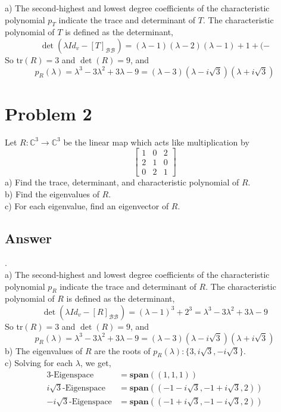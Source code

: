 \documentclass[
	12pt, %
]{fphw}
\newcommand\br{\vspace{10 pt}}
\newcommand\0{\mathbf{0}}
\newcommand\set[1]{\{#1\}}
\newcommand\C[1]{\text{$\mathbb{C}^{#1}$}}
\newcommand\B[1]{\text{$\mathcal{B}_{#1}$}}
\newcommand\spann[1]{\mathbf{span}(#1)}
\begin{document}
\br
\noindent
a) The second-highest and lowest degree coefficients of the characteristic polynomial $p_T$ indicate the trace and determinant of $T$. The characteristic polynomial of $T$ is defined as the determinant,
\begin{equation*}
\det(\lambda Id_v - [T]_{\B{}\B{}}) = (\lambda - 1)(\lambda - 2)(\lambda - 1) + 1 + (-
\end{equation*}
So tr$(R) = 3$ and $\det(R) = 9$, and
$$
p_R(\lambda) = \lambda^3 - 3 \lambda^2 + 3 \lambda - 9 = (\lambda - 3)(\lambda - i \sqrt{3})(\lambda + i \sqrt{3})
$$

\newpage
\section*{Problem 2}
\begin{problem}
Let $R: \C{3} \to \C{3}$ be the linear map which acts like multiplication by
\begin{equation*}
\begin{bmatrix}
1 & 0 & 2\\
2 & 1 & 0\\
0 & 2 & 1
\end{bmatrix}
\end{equation*}
\noindent
a) Find the trace, determinant, and characteristic polynomial of $R$.\\
b) Find the eigenvalues of $R$.\\
c) For each eigenvalue, find an eigenvector of $R$.
\end{problem}

\subsection*{Answer} .\\
a) The second-highest and lowest degree coefficients of the characteristic polynomial $p_R$ indicate the trace and determinant of $R$. The characteristic polynomial of $R$ is defined as the determinant,
\begin{equation*}
\det(\lambda Id_v - [R]_{\B{}\B{}}) = (\lambda - 1)^3 + 2^3 = \lambda^3 - 3 \lambda^2 +3 \lambda - 9
\end{equation*}
So tr$(R) = 3$ and $\det(R) = 9$, and
$$
p_R(\lambda) = \lambda^3 - 3 \lambda^2 + 3 \lambda - 9 = (\lambda - 3)(\lambda - i \sqrt{3})(\lambda + i \sqrt{3})
$$
b) The eigenvalues of $R$ are the roots of $p_R(\lambda) : \set{3, i\sqrt{3}, -i \sqrt{3}}$.\\
c) Solving for each $\lambda$, we get,
\begin{align*}
3\text{-Eigenspace} &= \spann{(1,1,1)}\\
i\sqrt{3}\text{-Eigenspace} &= \spann{(-1-i \sqrt 3, -1 + i \sqrt 3, 2)}\\
-i\sqrt{3}\text{-Eigenspace} &= \spann{(-1+i \sqrt 3, -1 - i \sqrt 3, 2)}
\end{align*}
\end{document}

